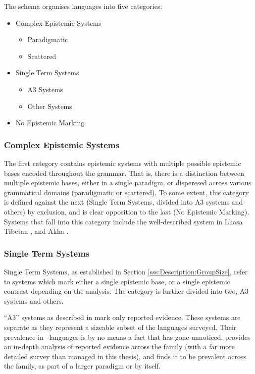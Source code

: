 The schema organises languages into five categories:
\begin{itemize}
    \item Complex Epistemic Systems
    \begin{itemize}
        \item Paradigmatic
        \item Scattered
    \end{itemize}
    \item Single Term Systems
    \begin{itemize}
        \item A3 Systems
        \item Other Systems
    \end{itemize}
    \item No Epistemic Marking
\end{itemize}
\subsubsection{Complex Epistemic Systems}
The first category contains epistemic systems with multiple possible epistemic bases encoded throughout the grammar. That is, there is a distinction between multiple epistemic bases, either in a single paradigm, or disperesed across various grammatical domains (paradigmatic or scattered). To some extent, this category is defined against the next (Single Term Systems, divided into A3 systems and others) by exclusion, and is clear opposition to the last (No Epistemic Marking). Systems that fall into this category include the well-described system in Lhasa Tibetan \cite{DeLancey2017Tibetan}, and Akha \cite{Thurgood1986}.
\subsubsection{Single Term Systems}
Single Term Systems, as established in Section \ref{sss:Description:GroupSize}, refer to systems which mark either a single epistemic base, or a single epistemic contrast depending on the analysis. The category is further divided into two, A3 systems and others.

``A3'' systems as described in  mark only reported evidence. These systems are separate as they represent a sizeable subset of the languages surveyed. Their prevalence in \lfam\ languages is by no means a fact that has gone unnoticed,  provides an in-depth analysis of reported evidence across the family (with a far more detailed survey than managed in this thesis), and finds it to be prevalent across the family, as part of a larger paradigm or by itself.

